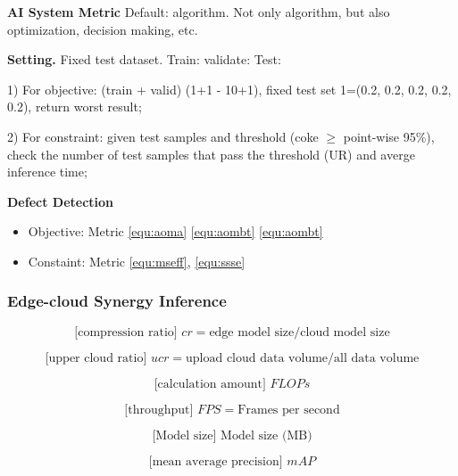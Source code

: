 \textbf{AI System Metric} Default: algorithm. Not only algorithm, but also optimization, decision making, etc. 

\textbf{Setting.} Fixed test dataset. 
Train: validate: Test:

1) For objective: (train + valid) (1+1 - 10+1), fixed test set 1=(0.2, 0.2, 0.2, 0.2, 0.2), return worst result; 

2) For constraint: given test samples and threshold (coke $\geq$ point-wise 95\%), check the number of test samples that pass the threshold (UR) and averge inference time;

\vspace{0.2cm}
\noindent \textbf{Defect Detection}
\begin{itemize}
    \item Objective: Metric \ref{equ:aoma} \ref{equ:aombt} \ref{equ:aombt} 
    \item Constaint: Metric \ref{equ:mseff}, \ref{equ:ssse}  
\end{itemize}

\subsubsection{Edge-cloud Synergy Inference}
\begin{equation}
\text{[compression ratio] } \label{equ:cr} 
cr =  \text{edge model size}  /  \text{cloud model size}  
\end{equation}

\begin{equation}
\text{[upper cloud ratio] } \label{equ:ucr} 
ucr = \text{upload cloud data volume} /  \text{all data volume} 
\end{equation}

\begin{equation}
\text{[calculation amount] } \label{equ:flops} 
FLOPs
\end{equation}

\begin{equation}
\text{[throughput] } \label{equ:fps} 
FPS =  \text{Frames per second} 
\end{equation}

\begin{equation}
\text{[Model size] } \label{equ:mz} 
 \text{Model size (MB)} 
\end{equation}

\begin{equation}
\text{[mean average  precision] } \label{equ:map} 
mAP
\end{equation}

